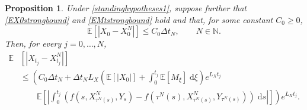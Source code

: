 \documentclass[reqno,12pt]{amsart}
\theoremstyle{plain}%
\newtheorem{prop}{Proposition}[section]
\theoremstyle{definition}
\begin{document}
\begin{prop}
    \label{propbasicestimate}
    Under \cref{standinghypotheses1}, suppose further that \eqref{EX0strongbound} and \eqref{EMtstrongbound} hold and that, for some constant $C_0 \geq 0$, 
    \begin{equation}
        \label{EX0X0N}
        \mathbb{E}[|X_0 - X_0^N|] \leq C_0 \Delta t_N, \qquad N\in \mathbb{N}.
    \end{equation}
    Then, for every $j = 0, \ldots, N$,
    \begin{equation}
        \label{expectedestimateglobalerrorintegral}
        \begin{aligned}
            \mathbb{E} & \left[|X_{t_j} - X_{t_j}^N|\right] \\
            & \leq \left( C_0 \Delta t_N + \Delta t_N L_X \left(\mathbb{E}[|X_0|] + \int_0^{t_j} \mathbb{E}[M_\xi]\;\mathrm{d}\xi\right)e^{L_X t_j}\right. \\
            & \qquad \left. \mathbb{E}\left[\left|\int_0^{t_j} \left( f(s, X_{\tau^N(s)}^N, Y_s) - f(\tau^N(s), X_{\tau^N(s)}^N, Y_{\tau^N(s)}) \right)\;\mathrm{d}s\right|\right]\right) e^{L_X t_j}.
        \end{aligned}
    \end{equation}
\end{prop}
\end{document}
